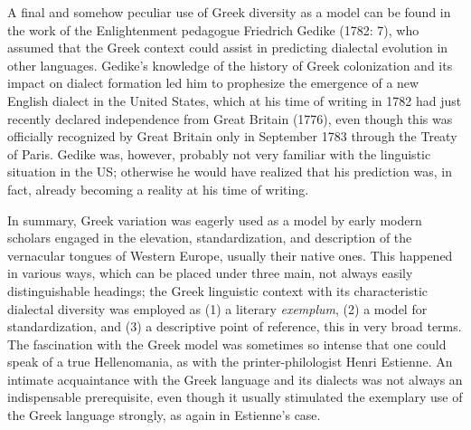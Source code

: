 \documentclass[12pt]{article}
\newenvironment{styleStandard}{\renewcommand\baselinestretch{1.25}\setlength\leftskip{0in}\setlength\rightskip{0in}\setlength\parindent{0.1972in}\setlength\parfillskip{0pt plus 1fil}\setlength\parskip{0in plus 1pt}\writerlistparindent\writerlistleftskip\leavevmode\normalfont\normalsize\writerlistlabel\ignorespaces}{\unskip\vspace{0in plus 1pt}\par}
\newcommand\writerlistleftskip{}
\newcommand\writerlistparindent{}
\newcommand\writerlistlabel{}
\begin{document}
\begin{styleStandard}
A final and somehow peculiar use of Greek diversity as a model can be found in the work of the Enlightenment pedagogue Friedrich Gedike (1782: 7), who assumed that the Greek context could assist in predicting dialectal evolution in other languages. Gedike’s knowledge of the history of Greek colonization and its impact on dialect formation led him to prophesize the emergence of a new English dialect in the United States, which at his time of writing in 1782 had just recently declared independence from Great Britain (1776), even though this was officially recognized by Great Britain only in September 1783 through the Treaty of Paris. Gedike was, however, probably not very familiar with the linguistic situation in the US; otherwise he would have realized that his prediction was, in fact, already becoming a reality at his time of writing.
\end{styleStandard}

\begin{styleStandard}
In summary, Greek variation was eagerly used as a model by early modern scholars engaged in the elevation, standardization, and description of the vernacular tongues of Western Europe, usually their native ones. This happened in various ways, which can be placed under three main, not always easily distinguishable headings; the Greek linguistic context with its characteristic dialectal diversity was employed as (1) a literary \textit{exemplum}, (2) a model for standardization, and (3) a descriptive point of reference, this in very broad terms. The fascination with the Greek model was sometimes so intense that one could speak of a true Hellenomania, as with the printer-philologist Henri Estienne. An intimate acquaintance with the Greek language and its dialects was not always an indispensable prerequisite, even though it usually stimulated the exemplary use of the Greek language strongly, as again in Estienne’s case.
\end{styleStandard}
\end{document}
